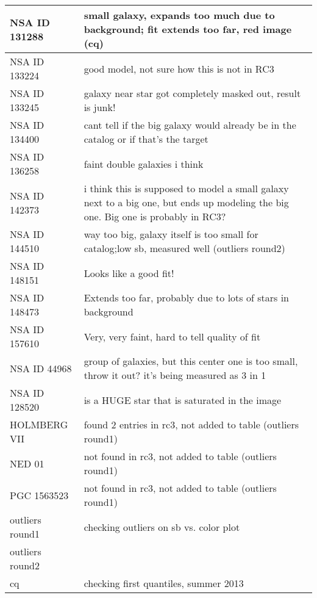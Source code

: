 \documentclass[10pt]{article}
\begin{document}
\begin{landscape}
\begin{longtable}{|l|l|}
NSA ID 131288 & small galaxy, expands too much due to background; fit extends too far, red image (cq)\\ \hline
NSA ID 133224 & good model, not sure how this is not in RC3\\ \hline
NSA ID 133245 & galaxy near star got completely masked out, result is junk!\\ \hline
NSA ID 134400 & cant tell if the big galaxy would already be in the catalog or if that's the target\\ \hline
NSA ID 136258 & faint double galaxies i think\\ \hline
NSA ID 142373 & i think this is supposed to model a small galaxy next to a big one, but ends up modeling the big one. Big one is probably in RC3?\\ \hline
NSA ID 144510 & way too big, galaxy itself is too small for catalog;low sb, measured well (outliers round2)\\ \hline
NSA ID 148151 & Looks like a good fit!\\ \hline
NSA ID 148473 & Extends too far, probably due to lots of stars in background\\ \hline
NSA ID 157610 & Very, very faint, hard to tell quality of fit\\ \hline
NSA ID 44968 & group of galaxies, but this center one is too small, throw it out? it's being measured as 3 in 1\\ \hline
NSA ID 128520 & is a HUGE star that is saturated in the image\\ \hline
HOLMBERG VII & found 2 entries in rc3, not added to table (outliers round1)\\ \hline
NED 01 & not found in rc3, not added to table (outliers round1)\\ \hline
PGC 1563523 & not found in rc3, not added to table (outliers round1)\\ \hline
outliers round1 & checking outliers on sb vs. color plot\\ \hline
outliers round2 &\\ \hline
cq & checking first quantiles, summer 2013 \\ \hline
\end{longtable}
\end{landscape}
\end{document}
